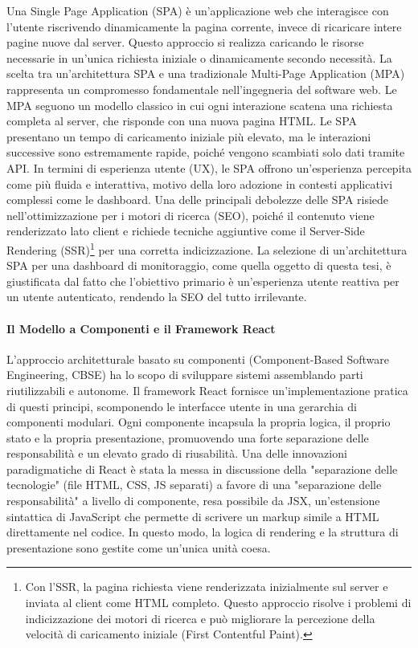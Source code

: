 \documentclass[12pt,a4paper,openright,twoside]{book}
\begin{document}
Una Single Page Application (SPA) è un'applicazione web che interagisce con l'utente riscrivendo dinamicamente la pagina corrente, invece di ricaricare intere pagine nuove dal server. Questo approccio si realizza caricando le risorse necessarie in un'unica richiesta iniziale o dinamicamente secondo necessità. La scelta tra un'architettura SPA e una tradizionale Multi-Page Application (MPA) rappresenta un compromesso fondamentale nell'ingegneria del software web. Le MPA seguono un modello classico in cui ogni interazione scatena una richiesta completa al server, che risponde con una nuova pagina HTML. Le SPA presentano un tempo di caricamento iniziale più elevato, ma le interazioni successive sono estremamente rapide, poiché vengono scambiati solo dati tramite API. In termini di esperienza utente (UX), le SPA offrono un'esperienza percepita come più fluida e interattiva, motivo della loro adozione in contesti applicativi complessi come le dashboard. Una delle principali debolezze delle SPA risiede nell'ottimizzazione per i motori di ricerca (SEO), poiché il contenuto viene renderizzato lato client e richiede tecniche aggiuntive come il Server-Side Rendering (SSR)\footnote{Con l'SSR, la pagina richiesta viene renderizzata inizialmente sul server e inviata al client come HTML completo. Questo approccio risolve i problemi di indicizzazione dei motori di ricerca e può migliorare la percezione della velocità di caricamento iniziale (First Contentful Paint).} per una corretta indicizzazione. La selezione di un'architettura SPA per una dashboard di monitoraggio, come quella oggetto di questa tesi, è giustificata dal fatto che l'obiettivo primario è un'esperienza utente reattiva per un utente autenticato, rendendo la SEO del tutto irrilevante.

\paragraph{Il Modello a Componenti e il Framework React}
L'approccio architetturale basato su componenti (Component-Based Software Engineering, CBSE) ha lo scopo di sviluppare sistemi assemblando parti riutilizzabili e autonome. Il framework React fornisce un'implementazione pratica di questi principi, scomponendo le interfacce utente in una gerarchia di componenti modulari. Ogni componente incapsula la propria logica, il proprio stato e la propria presentazione, promuovendo una forte separazione delle responsabilità e un elevato grado di riusabilità. Una delle innovazioni paradigmatiche di React è stata la messa in discussione della "separazione delle tecnologie" (file HTML, CSS, JS separati) a favore di una "separazione delle responsabilità" a livello di componente, resa possibile da JSX, un'estensione sintattica di JavaScript che permette di scrivere un markup simile a HTML direttamente nel codice. In questo modo, la logica di rendering e la struttura di presentazione sono gestite come un'unica unità coesa.
\end{document}
